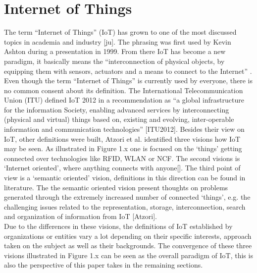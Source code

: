 \section{Internet of Things}
The term ``Internet of Things'' (IoT) has grown to one of the most discussed topics in academia and industry [ju]. The phrasing was first used by Kevin Ashton during a presentation in 1999. From there IoT has become a new paradigm, it basically means the ``interconnection of physical objects, by equipping them with sensors, actuators and a means to connect to the Internet'' \cite{dijkman}.\\
Even though the term ``Internet of Things'' is currently used by everyone, there is no common consent about its definition. The International Telecommunication Union (ITU) defined IoT 2012 in a recommendation as ``a global infrastructure for the information Society, enabling advanced services by interconnecting (physical and virtual) things based on, existing and evolving, inter-operable information and communication technologies'' [ITU2012]. Besides their view on IoT, other definitions were built, Atzori et al. identified three visions how IoT may be seen. As illustrated in Figure 1.x one is focused on the `things' getting connected over technologies like RFID, WLAN or NCF. The second visions is `Internet oriented', where anything connects with anyone[]. The third point of view is a `semantic oriented' vision, definitions in this direction can be found in literature. The the semantic oriented vision present thoughts on problems generated through the extremely increased number of connected `things', e.g. the challenging issues related to the representation, storage, interconnection, search and organization of information from IoT [Atzori].\\
Due to the differences in these visions, the definitions of IoT established by organizations or entities vary a lot depending on their specific interests, approach taken on the subject as well as their backgrounds. The convergence of these three visions illustrated in Figure 1.x can be seen as the overall paradigm of IoT, this is also the perspective of this paper takes in the remaining sections. 


